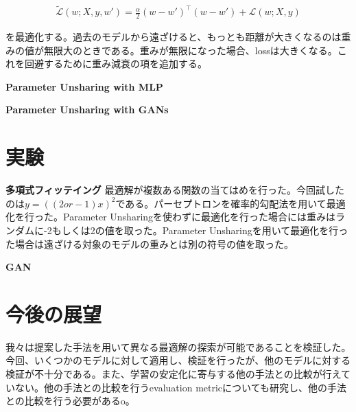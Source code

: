 \documentclass[techrep, submit, noauthor,preface]{ipsj}
\begin{document}
\begin{eqnarray}
  \label{unshare}
  \tilde{\mathcal{L}}(w; X, y, w') =  \frac{\alpha}{2} (w - w')^{\top}(w - w')+ \mathcal{L}(w; X, y)  
\end{eqnarray}


を最適化する。過去のモデルから遠ざけると、もっとも距離が大きくなるのは重みの値が無限大のときである。重みが無限になった場合、lossは大きくなる。これを回避するために重み減衰の項を追加する。


{\bf Parameter Unsharing with MLP}

{\bf Parameter Unsharing with GANs}

\section{実験}

{\bf 多項式フィッテイング}
最適解が複数ある関数の当てはめを行った。今回試したのは$y = ((2or-1)x)^2$である。パーセプトロンを確率的勾配法を用いて最適化を行った。Parameter Unsharingを使わずに最適化を行った場合には重みはランダムに-2もしくは2の値を取った。Parameter Unsharingを用いて最適化を行った場合は遠ざける対象のモデルの重みとは別の符号の値を取った。

{\bf GAN}


\section{今後の展望}

我々は提案した手法を用いて異なる最適解の探索が可能であることを検証した。今回、いくつかのモデルに対して適用し、検証を行ったが、他のモデルに対する検証が不十分である。また、学習の安定化に寄与する他の手法との比較が行えていない。他の手法との比較を行うevaluation metricについても研究し、他の手法との比較を行う必要があるo。



\end{document}

